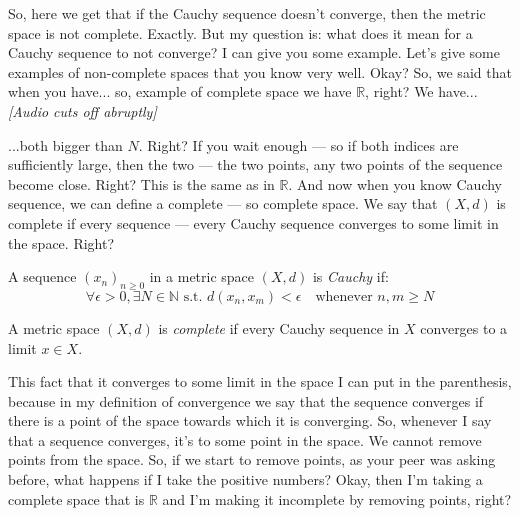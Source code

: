 \begin{spoken-clean}[00:20:19 - 00:21:30]
So, here we get that if the Cauchy sequence doesn't converge, then the metric space is not complete. Exactly. But my question is: what does it mean for a Cauchy sequence to not converge? I can give you some example. Let's give some examples of non-complete spaces that you know very well. Okay? So, we said that when you have... so, example of complete space we have $\mathbb{R}$, right? We have... \textit{[Audio cuts off abruptly]}
\end{spoken-clean}



\begin{spoken-clean}[00:00:00 - 00:01:25]
 ...both bigger than $N$. Right? If you wait enough --- so if both indices are sufficiently large, then the two --- the two points, any two points of the sequence become close. Right? This is the same as in $\mathbb{R}$. And now when you know Cauchy sequence, we can define a complete --- so complete space.  We say that $(X, d)$ is complete if every sequence --- every Cauchy sequence converges to some limit in the space. Right?
\end{spoken-clean}

\begin{math-stroke}
\begin{definition}\label{def:cauchy-sequence-v2}
A sequence $(x_n)_{n \ge 0}$ in a metric space $(X, d)$ is \emph{Cauchy} if:
\[ \forall \epsilon > 0, \exists N \in \mathbb{N} \text{ s.t. } d(x_n, x_m) < \epsilon \quad \text{whenever } n, m \ge N \]
\end{definition}

\begin{definition}\label{def:complete-space-v2}
A metric space $(X, d)$ is \emph{complete} if every Cauchy sequence in $X$ converges to a limit $x \in X$.
\end{definition}
\end{math-stroke}

\begin{spoken-clean}[00:01:25 - 00:02:26]
This fact that it converges to some limit in the space I can put in the parenthesis, because in my definition of convergence we say that the sequence converges if there is a point of the space towards which it is converging. So, whenever I say that a sequence converges, it's to some point in the space. We cannot remove points from the space. So, if we start to remove points, as your peer was asking before, what happens if I take the positive numbers? Okay, then I'm taking a complete space that is $\mathbb{R}$ and I'm making it incomplete by removing points, right?
\end{spoken-clean}


